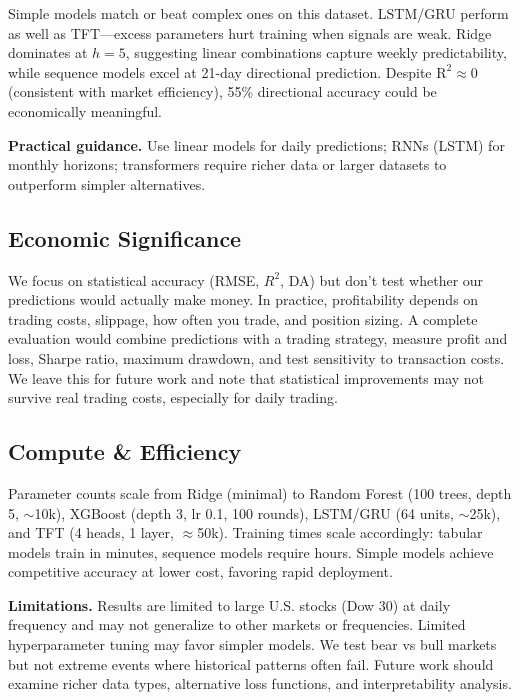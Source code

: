 \documentclass[conference,a4paper]{IEEEtran}
\newcommand{\rTwo}{\ensuremath{\mathrm{R}^2}}
\begin{document}
Simple models match or beat complex ones on this dataset. LSTM/GRU perform as well as TFT---excess parameters hurt training when signals are weak. Ridge dominates at $h=5$, suggesting linear combinations capture weekly predictability, while sequence models excel at 21-day directional prediction. Despite $\rTwo \approx 0$ (consistent with market efficiency), 55\% directional accuracy could be economically meaningful.

\textbf{Practical guidance.} Use linear models for daily predictions; RNNs (LSTM) for monthly horizons; transformers require richer data or larger datasets to outperform simpler alternatives.

\subsection{Economic Significance}\label{sec:econ}
	We focus on statistical accuracy (RMSE, $R^2$, DA) but don't test whether our predictions would actually make money. In practice, profitability depends on trading costs, slippage, how often you trade, and position sizing. A complete evaluation would combine predictions with a trading strategy, measure profit and loss, Sharpe ratio, maximum drawdown, and test sensitivity to transaction costs. We leave this for future work and note that statistical improvements may not survive real trading costs, especially for daily trading.

\subsection{Compute \& Efficiency}\label{sec:compute}
    Parameter counts scale from Ridge (minimal) to Random Forest (100 trees, depth 5, $\sim$10k), XGBoost (depth 3, lr 0.1, 100 rounds), LSTM/GRU (64 units, $\sim$25k), and TFT (4 heads, 1 layer, $\approx$50k). Training times scale accordingly: tabular models train in minutes, sequence models require hours. Simple models achieve competitive accuracy at lower cost, favoring rapid deployment.


	\textbf{Limitations.} Results are limited to large U.S. stocks (Dow 30) at daily frequency and may not generalize to other markets or frequencies. Limited hyperparameter tuning may favor simpler models. We test bear vs bull markets but not extreme events where historical patterns often fail. Future work should examine richer data types, alternative loss functions, and interpretability analysis.
\end{document}
